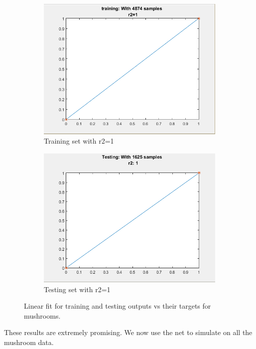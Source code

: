 \documentclass[10pt]{article}
\begin{document}
\begin{center}
\begin{figure}[h]
  \begin{subfigure}[b]{0.49\textwidth}
    \includegraphics[width=\textwidth]{mush_trainr}
    \caption{Training set with r2=1 }
    \label{fig:1}
  \end{subfigure}
  \begin{subfigure}[b]{0.49\textwidth}
    \includegraphics[width=\textwidth]{mush_testr}
    \caption{Testing set with r2=1}
    \label{fig:2}
  \end{subfigure}
  \caption{Linear fit for training and testing outputs vs their targets for mushrooms.}
\end{figure}
\end{center}
These results are extremely promising. We now use the net to simulate on all the mushroom data.
\\
\end{document}
